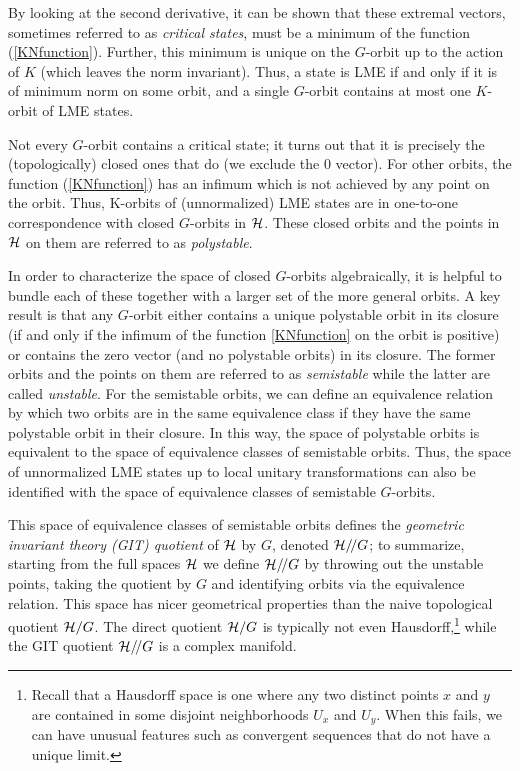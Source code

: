 \documentclass[12pt]{article}
\theoremstyle{definition}
\newcommand{\GITquot}{/\!/}
\begin{document}
By looking at the second derivative, it can be shown that these extremal vectors, sometimes referred to as {\it critical states}, must be a minimum of the function (\ref{KNfunction}).  Further, this minimum is unique on the $G$-orbit up to the action of $K$ (which leaves the norm invariant). Thus, a state is LME if and only if it is of minimum norm on some orbit, and a single $G$-orbit contains at most one $K$-orbit of LME states.

Not every $G$-orbit contains a critical state; it turns out that it is precisely the (topologically) closed ones that do (we exclude the 0 vector). For other orbits, the function (\ref{KNfunction}) has an infimum which is not achieved by any point on the orbit. Thus, K-orbits of (unnormalized) LME states are in one-to-one correspondence with closed $G$-orbits in ${\cal H}$. These closed orbits and the points in ${\cal H}$ on them are referred to as {\it polystable}.

In order to characterize the space of closed $G$-orbits algebraically, it is helpful to bundle each of these together with a larger set of the more general orbits. A key result is that any $G$-orbit either contains a unique polystable orbit in its closure (if and only if the infimum of the function \ref{KNfunction} on the orbit is positive) or contains the zero vector (and no polystable orbits) in its closure. The former orbits and the points on them are referred to as {\it semistable} while the latter are called {\it unstable}. For the semistable orbits, we can define an equivalence relation by which two orbits are in the same equivalence class if they have the same polystable orbit in their closure. In this way, the space of polystable orbits is equivalent to the space of equivalence classes of semistable orbits. Thus, the space of unnormalized LME states up to local unitary transformations can also be identified with the space of equivalence classes of semistable $G$-orbits.

This space of equivalence classes of semistable orbits defines the {\it geometric invariant theory (GIT) quotient} of ${\cal H}$ by $G$, denoted ${\cal H}\GITquot G$; to summarize, starting from the full spaces ${\cal H}$ we define ${\cal H}\GITquot G$ by throwing out the unstable points, taking the quotient by $G$ and identifying orbits via the equivalence relation. This space has nicer geometrical properties than the naive topological quotient ${\cal H}/G$. The direct quotient ${\cal H}/G$ is typically not even Hausdorff,\footnote{Recall that a Hausdorff space is one where any two distinct points $x$ and $y$ are contained in some disjoint neighborhoods $U_x$ and $U_y$. When this fails, we can have unusual features such as convergent sequences that do not have a unique limit.} while the GIT quotient ${\cal H}\GITquot G$ is a complex manifold.
\end{document}
